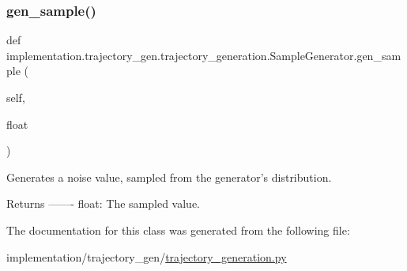 \subsubsection{\texorpdfstring{gen\+\_\+sample()}{gen\_sample()}}
{\footnotesize\ttfamily def implementation.\+trajectory\+\_\+gen.\+trajectory\+\_\+generation.\+Sample\+Generator.\+gen\+\_\+sample (\begin{DoxyParamCaption}\item[{}]{self,  }\item[{}]{float }\end{DoxyParamCaption})}

\begin{DoxyVerb}Generates a noise value, sampled from the generator's distribution.

Returns
-------
    float: The sampled value.
\end{DoxyVerb}
 

The documentation for this class was generated from the following file\+:\begin{DoxyCompactItemize}
\item 
implementation/trajectory\+\_\+gen/\hyperlink{trajectory__generation_8py}{trajectory\+\_\+generation.\+py}\end{DoxyCompactItemize}
